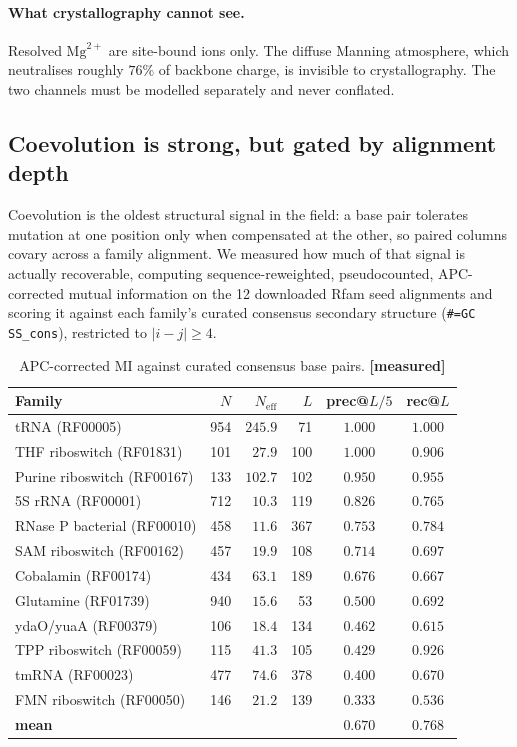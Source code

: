 \documentclass[11pt,a4paper]{article}
\newcommand{\meas}{\textcolor{measured}{\textbf{[measured]}}}
\begin{document}
\paragraph{What crystallography cannot see.} Resolved $\mathrm{Mg}^{2+}$ are
site-bound ions only. The diffuse Manning atmosphere, which neutralises roughly
$76\%$ of backbone charge, is invisible to crystallography. The two channels
must be modelled separately and never conflated.

\subsection{Coevolution is strong, but gated by alignment depth}
\label{sec:coev}

Coevolution is the oldest structural signal in the field: a base pair tolerates
mutation at one position only when compensated at the other, so paired columns
covary across a family alignment. We measured how much of that signal is
actually recoverable, computing sequence-reweighted, pseudocounted,
APC-corrected mutual information on the 12 downloaded Rfam seed alignments and
scoring it against each family's curated consensus secondary structure
(\texttt{\#=GC SS\_cons}), restricted to $|i-j| \geq 4$.

\begin{table}[h]
\centering
\caption{APC-corrected MI against curated consensus base pairs. \meas}
\label{tab:coev}
\small
\begin{tabular}{lrrrcc}
\toprule
\textbf{Family} & \textbf{$N$} & \textbf{$N_{\text{eff}}$} & \textbf{$L$} & \textbf{prec@$L/5$} & \textbf{rec@$L$} \\
\midrule
tRNA (RF00005)              & 954 & $245.9$ & 71  & $\mathbf{1.000}$ & $\mathbf{1.000}$ \\
THF riboswitch (RF01831)    & 101 & $27.9$  & 100 & $1.000$ & $0.906$ \\
Purine riboswitch (RF00167) & 133 & $102.7$ & 102 & $0.950$ & $0.955$ \\
5S rRNA (RF00001)           & 712 & $10.3$  & 119 & $0.826$ & $0.765$ \\
RNase P bacterial (RF00010) & 458 & $11.6$  & 367 & $0.753$ & $0.784$ \\
SAM riboswitch (RF00162)    & 457 & $19.9$  & 108 & $0.714$ & $0.697$ \\
Cobalamin (RF00174)         & 434 & $63.1$  & 189 & $0.676$ & $0.667$ \\
Glutamine (RF01739)         & 940 & $15.6$  & 53  & $0.500$ & $0.692$ \\
ydaO/yuaA (RF00379)         & 106 & $18.4$  & 134 & $0.462$ & $0.615$ \\
TPP riboswitch (RF00059)    & 115 & $41.3$  & 105 & $0.429$ & $0.926$ \\
tmRNA (RF00023)             & 477 & $74.6$  & 378 & $0.400$ & $0.670$ \\
FMN riboswitch (RF00050)    & 146 & $21.2$  & 139 & $0.333$ & $0.536$ \\
\midrule
\textbf{mean}               &     &         &     & $\mathbf{0.670}$ & $\mathbf{0.768}$ \\
\bottomrule
\end{tabular}
\end{table}
\end{document}
